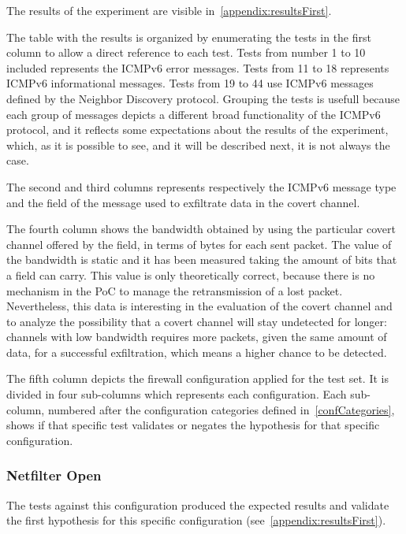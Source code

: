 \documentclass[12pt]{article}
\begin{document}
The results of the experiment are visible in~\ref{appendix:resultsFirst}.

The table with the results is organized by enumerating the tests in the first column to allow a direct reference to each test. Tests from number 1 to 10 included represents the ICMPv6 error messages. Tests from 11 to 18 represents ICMPv6 informational messages. Tests from 19 to 44 use ICMPv6 messages defined by the Neighbor Discovery protocol. Grouping the tests is usefull because each group of messages depicts a different broad functionality of the ICMPv6 protocol, and it reflects some expectations about the results of the experiment, which, as it is possible to see, and it will be described next, it is not always the case.

The second and third columns represents respectively the ICMPv6 message type and the field of the message used to exfiltrate data in the covert channel.

The fourth column shows the bandwidth obtained by using the particular covert channel offered by the field, in terms of bytes for each sent packet. The value of the bandwidth is static and it has been measured taking the amount of bits that a field can carry. This value is only theoretically correct, because there is no mechanism in the PoC to manage the retransmission of a lost packet. Nevertheless, this data is interesting in the evaluation of the covert channel and to analyze the possibility that a covert channel will stay undetected for longer: channels with low bandwidth requires more packets, given the same amount of data, for a successful exfiltration, which means a higher chance to be detected.

The fifth column depicts the firewall configuration applied for the test set. It is divided in four sub-columns which represents each configuration. Each sub-column, numbered after the configuration categories defined in~\ref{confCategories}, shows if that specific test validates or negates the hypothesis for that specific configuration.

\subsubsection{Netfilter Open}
\label{resultsFirstNetfilterOpen}

The tests against this configuration produced the expected results and validate the first hypothesis for this specific configuration (see~\ref{appendix:resultsFirst}).
\end{document}
